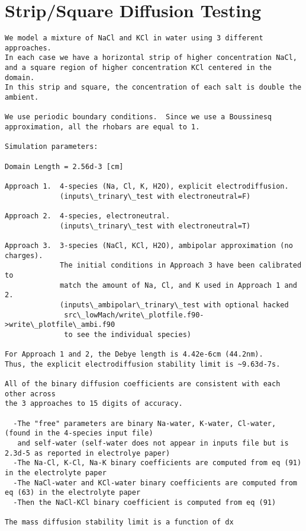 \documentclass[final]{siamltex}
\begin{document}
\section{Strip/Square Diffusion Testing}

\begin{verbatim}
We model a mixture of NaCl and KCl in water using 3 different approaches.
In each case we have a horizontal strip of higher concentration NaCl,
and a square region of higher concentration KCl centered in the domain.
In this strip and square, the concentration of each salt is double the ambient.

We use periodic boundary conditions.  Since we use a Boussinesq 
approximation, all the rhobars are equal to 1.

Simulation parameters:

Domain Length = 2.56d-3 [cm]

Approach 1.  4-species (Na, Cl, K, H2O), explicit electrodiffusion.
             (inputs\_trinary\_test with electroneutral=F)

Approach 2.  4-species, electroneutral.
             (inputs\_trinary\_test with electroneutral=T)

Approach 3.  3-species (NaCl, KCl, H2O), ambipolar approximation (no charges).
             The initial conditions in Approach 3 have been calibrated to
             match the amount of Na, Cl, and K used in Approach 1 and 2.
             (inputs\_ambipolar\_trinary\_test with optional hacked 
              src\_lowMach/write\_plotfile.f90->write\_plotfile\_ambi.f90
              to see the individual species)

For Approach 1 and 2, the Debye length is 4.42e-6cm (44.2nm).
Thus, the explicit electrodiffusion stability limit is ~9.63d-7s.

All of the binary diffusion coefficients are consistent with each other across
the 3 approaches to 15 digits of accuracy.

  -The "free" parameters are binary Na-water, K-water, Cl-water, (found in the 4-species input file)
   and self-water (self-water does not appear in inputs file but is 2.3d-5 as reported in electrolye paper)
  -The Na-Cl, K-Cl, Na-K binary coefficients are computed from eq (91) in the electrolyte paper
  -The NaCl-water and KCl-water binary coefficients are computed from eq (63) in the electrolyte paper
  -Then the NaCl-KCl binary coefficient is computed from eq (91)

The mass diffusion stability limit is a function of dx


\end{verbatim}
\end{document}
